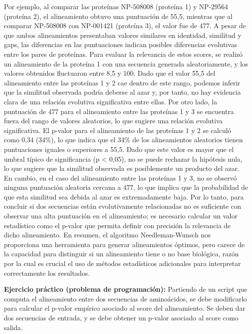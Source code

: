 Por ejemplo, al comparar las proteínas NP-508008 (proteína 1) y NP-29564 (proteína 2), el alineamiento obtuvo una puntuación de 55,5, mientras que al comparar NP-508008 con NP-001421 (proteína 3), el valor fue de 477. A pesar de que ambos alineamientos presentaban valores similares en identidad, similitud y gaps, las diferencias en las puntuaciones indican posibles diferencias evolutivas entre los pares de proteínas. Para evaluar la relevancia de estos scores, se realizó un alineamiento de la proteína 1 con una secuencia generada aleatoriamente, y los valores obtenidos fluctuaron entre 8,5 y 100. Dado que el valor 55,5 del alineamiento entre las proteínas 1 y 2 cae dentro de este rango, podemos inferir que la similitud observada podría deberse al azar y, por tanto, no hay evidencia clara de una relación evolutiva significativa entre ellas. Por otro lado, la puntuación de 477 para el alineamiento entre las proteínas 1 y 3 se encuentra fuera del rango de valores aleatorios, lo que sugiere una relación evolutiva significativa. El p-valor para el alineamiento de las proteínas 1 y 2 se calculó como 0,34 (34\%), lo que indica que el 34\% de los alineamientos aleatorios tienen puntuaciones iguales o superiores a 55,5. Dado que este valor es mayor que el umbral típico de significancia (p < 0,05), no se puede rechazar la hipótesis nula, lo que sugiere que la similitud observada es posiblemente un producto del azar. En cambio, en el caso del alineamiento entre las proteínas 1 y 3, no se observó ninguna puntuación aleatoria cercana a 477, lo que implica que la probabilidad de que esta similitud sea debida al azar es extremadamente baja. Por lo tanto, para concluir si dos secuencias están evolutivamente relacionadas no es suficiente con observar una alta puntuación en el alineamiento; es necesario calcular un valor estadístico como el p-valor que permita definir con precisión la relevancia de dicho alineamiento. En resumen, el algoritmo Needleman-Wunsch nos proporciona una herramienta para generar alineamientos óptimos, pero carece de la capacidad para distinguir si un alineamiento tiene o no base biológica, razón por la cual es crucial el uso de métodos estadísticos adicionales para interpretar correctamente los resultados.

\textbf{Ejercicio práctico (problema de programación):} Partiendo de un script que computa el alineamiento entre dos secuencias de aminoácidos, se debe modificarlo para calcular el p-valor empírico asociado al score del alineamiento.  Se deben dar dos secuencias de entrada, y se debe obtener un p-valor asociado al score como salida.


